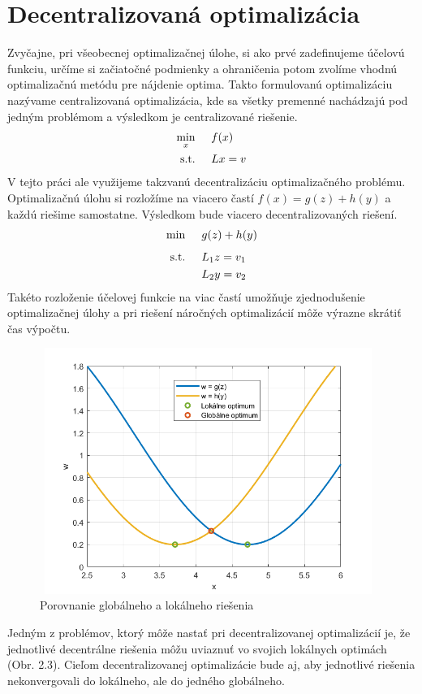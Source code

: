 \section{Decentralizovaná optimalizácia}
\label{se:DecentralizovanaOptimalizacia}
Zvyčajne, pri všeobecnej optimalizačnej úlohe, si ako prvé zadefinujeme účelovú funkciu, určíme si začiatočné podmienky a ohraničenia potom zvolíme vhodnú optimalizačnú metódu pre nájdenie optima. Takto formulovanú optimalizáciu nazývame centralizovaná optimalizácia, kde sa všetky premenné nachádzajú pod jedným problémom a výsledkom je centralizované riešenie. 
\begin{subequations}
	\begin{align}
		\displaystyle \min_{x} \hspace{0.5cm} & 
		f(x)\\
		\textrm{s.t.} \hspace{0.5cm} & Lx = v
	\end{align}
\end{subequations}
V tejto práci ale využijeme takzvanú decentralizáciu optimalizačného problému. Optimalizačnú úlohu si rozložíme na viacero častí $ f(x) = g(z) + h(y)$ a každú riešime samostatne. Výsledkom bude viacero decentralizovaných riešení.
\begin{subequations}
	\begin{align}
		\displaystyle \min_{} \hspace{0.5cm} & 
		g(z) + h(y)\\
		\textrm{s.t.} \hspace{0.5cm} & L_{1}z = v_1\\
		& L_{2}y = v_2
	\end{align}
\end{subequations}
Takéto rozloženie účelovej funkcie na viac častí umožňuje zjednodušenie optimalizačnej úlohy a pri riešení náročných optimalizácií môže výrazne skrátiť čas výpočtu.
\begin{figure}[H]
	\centering
	\includegraphics[width=11cm,height=8cm]{images/Global_Local_ADM}
	\caption{Porovnanie globálneho a lokálneho riešenia}
\end{figure}
Jedným z problémov, ktorý môže nastať pri decentralizovanej optimalizácií je, že jednotlivé decentrálne riešenia môžu uviaznuť vo svojich lokálnych optimách (Obr. 2.3). Cieľom decentralizovanej optimalizácie bude aj, aby jednotlivé riešenia nekonvergovali do lokálneho, ale do jedného globálneho. 
